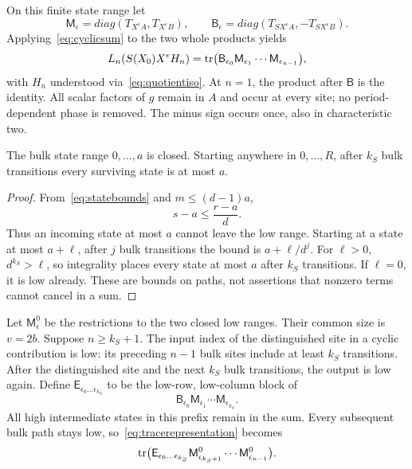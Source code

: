 On this finite state range let
\begin{equation}\label{eq:blocks}
 \mathsf M_\epsilon=diag(T_{X^\epsilon A},T_{X^\epsilon B}),
 \qquad
 \mathsf B_\epsilon=diag(T_{SX^\epsilon A},-T_{SX^\epsilon B}).
\end{equation}
Applying~\eqref{eq:cyclicsum} to the two whole products yields
\begin{equation}\label{eq:tracerepresentation}
 L_n(S(X_0)X^\epsilon H_n)=
 \operatorname{tr}\bigl(\mathsf B_{\epsilon_0}\mathsf M_{\epsilon_1}
                    \cdots\mathsf M_{\epsilon_{n-1}}\bigr),
\end{equation}
with $H_n$ understood via~\eqref{eq:quotientiso}. At $n=1$, the
product after $\mathsf B$ is the identity. All scalar factors of
$g$ remain in $A$ and occur at every site; no period-dependent
phase is removed. The minus sign occurs once, also in
characteristic two.

\begin{lemma}
\label{lem:contraction}
The bulk state range $0,\ldots,a$ is closed. Starting anywhere in
$0,\ldots,R$, after $k_S$ bulk transitions every surviving state
is at most $a$.
\end{lemma}
\begin{proof}
From~\eqref{eq:statebounds} and $m\le(d-1)a$,
\[
 s-a\le\frac{r-a}{d}.
\]
Thus an incoming state at most $a$ cannot leave the low range.
Starting at a state at most $a+\ell$, after $j$ bulk transitions
the bound is $a+\ell/d^j$. For $\ell>0$,
$d^{k_S}>\ell$, so integrality places every state at most $a$
after $k_S$ transitions. If $\ell=0$, it is low already. These
are bounds on paths, not assertions that nonzero terms cannot
cancel in a sum.
\end{proof}

Let $\mathsf M^0_\epsilon$ be the restrictions to the two closed
low ranges. Their common size is $v=2b$. Suppose $n\ge k_S+1$.
The input index of the distinguished site in a cyclic contribution
is low: its preceding $n-1$ bulk sites include at least $k_S$
transitions. After the distinguished site and the next $k_S$
bulk transitions, the output is low again. Define
$\mathsf E_{\epsilon_0\ldots\epsilon_{k_S}}$ to be the low-row,
low-column block of
\[
 \mathsf B_{\epsilon_0}\mathsf M_{\epsilon_1}
                    \cdots\mathsf M_{\epsilon_{k_S}}.
\]
All high intermediate states in this prefix remain in the sum.
Every subsequent bulk path stays low, so~\eqref{eq:tracerepresentation}
becomes
\begin{equation}\label{eq:prefixtrace}
 \operatorname{tr}\bigl(\mathsf E_{\epsilon_0\ldots\epsilon_{k_S}}
       \mathsf M^0_{\epsilon_{k_S+1}}\cdots
       \mathsf M^0_{\epsilon_{n-1}}\bigr).
\end{equation}

